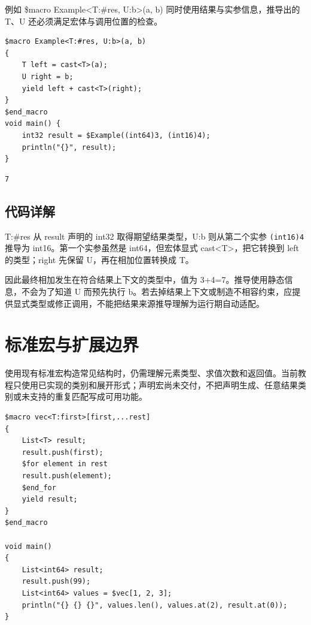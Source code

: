 例如 \$macro Example<T:\#res, U:b>(a, b) 同时使用结果与实参信息，推导出的 T、U 还必须满足宏体与调用位置的检查。

\par
\medskip
\begin{lstlisting}[style=chali]
$macro Example<T:#res, U:b>(a, b)
{
    T left = cast<T>(a);
    U right = b;
    yield left + cast<T>(right);
}
$end_macro
void main() {
    int32 result = $Example((int64)3, (int16)4);
    println("{}", result);
}
\end{lstlisting}
\par
\medskip

\par
\medskip
\begin{lstlisting}[style=out]
7
\end{lstlisting}
\par
\medskip

\subsection*{代码详解}

T:\#res 从 result 声明的 int32 取得期望结果类型，U:b 则从第二个实参 \texttt{(\allowbreak{}int16)\allowbreak{}4} 推导为 int16。第一个实参虽然是 int64，但宏体显式 cast<T>，把它转换到 left 的类型；right 先保留 U，再在相加位置转换成 T。

因此最终相加发生在符合结果上下文的类型中，值为 3+4=7。推导使用静态信息，不会为了知道 U 而预先执行 b。若去掉结果上下文或制造不相容约束，应提供显式类型或修正调用，不能把结果来源推导理解为运行期自动适配。

\section{标准宏与扩展边界}

使用现有标准宏构造常见结构时，仍需理解元素类型、求值次数和返回值。当前教程只使用已实现的类别和展开形式；声明宏尚未交付，不把声明生成、任意结果类别或未支持的重复匹配写成可用功能。

\par
\medskip
\begin{lstlisting}[style=chali]
$macro vec<T:first>[first,...rest]
{
    List<T> result;
    result.push(first);
    $for element in rest
    result.push(element);
    $end_for
    yield result;
}
$end_macro

void main()
{
    List<int64> result;
    result.push(99);
    List<int64> values = $vec[1, 2, 3];
    println("{} {} {}", values.len(), values.at(2), result.at(0));
}
\end{lstlisting}
\par
\medskip

